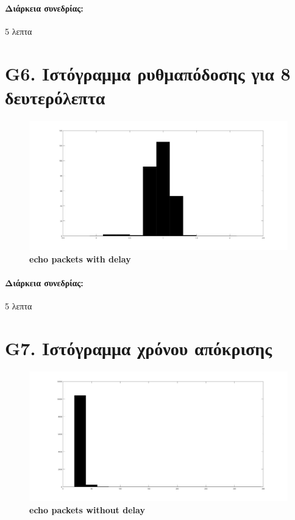 \documentclass{article}
\begin{document}
\paragraph{Διάρκεια συνεδρίας:} 5 λεπτα
\newpage
\large{}

\section*{G6. Ιστόγραμμα  ρυθμαπόδοσης για 8 δευτερόλεπτα}

\begin{figure}[h!]
 \begin{center}
 \advance\leftskip-6.8cm
  \includegraphics[width=250mm,scale=0.7]{g6s2.jpg}
    \caption*{\textbf{echo packets with delay}}
  
\end{center}
\end{figure}
\paragraph{Διάρκεια συνεδρίας:} 5 λεπτα
\newpage
\large{}

\section*{G7. Ιστόγραμμα χρόνου απόκρισης}

\begin{figure}[h!]
 \begin{center}
 \advance\leftskip-6.8cm
  \includegraphics[width=250mm,scale=0.7]{g7s2.jpg}
    \caption*{\textbf{echo packets without delay}}
  
\end{center}
\end{figure}
\end{document}
